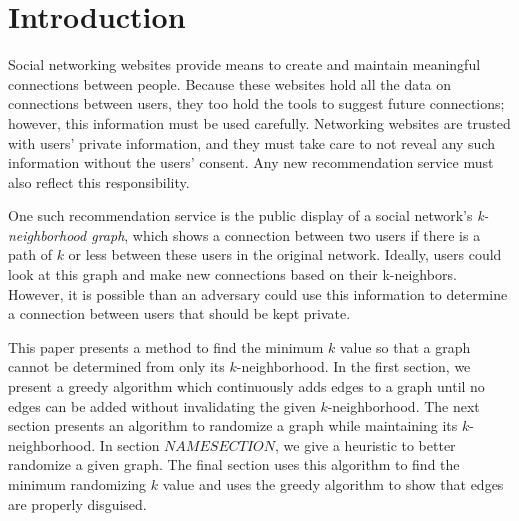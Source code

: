 \section{Introduction}

\indent Social networking websites provide means to create and maintain meaningful connections between people. Because these websites hold all the data on connections between users, they too hold the tools to suggest future connections; however, this information must be used carefully. Networking websites are trusted with users' private information, and they must take care to not reveal any such information without the users' consent. Any new recommendation service must also reflect this responsibility.

\indent One such recommendation service is the public display of a social network's  \emph{k-neighborhood graph}, which shows a connection between two users if there is a path of $k$ or less between these users in the original network. Ideally,  users could look at this graph and make new connections based on their k-neighbors. However, it is possible than an adversary could use this information to determine a connection between users that should be kept private. 

\indent This paper presents a method to find the minimum $k$ value so that a graph cannot be determined from only its $k$-neighborhood. In the first section, we present a greedy algorithm which continuously adds edges to a graph until no edges can be added without invalidating the given $k$-neighborhood. The next section presents an algorithm to randomize a graph while maintaining its $k$-neighborhood. In section $NAME SECTION$, we give a heuristic to better randomize a given graph. The final section uses this algorithm to find the minimum randomizing $k$ value and uses the greedy algorithm to show that edges are properly disguised. 
